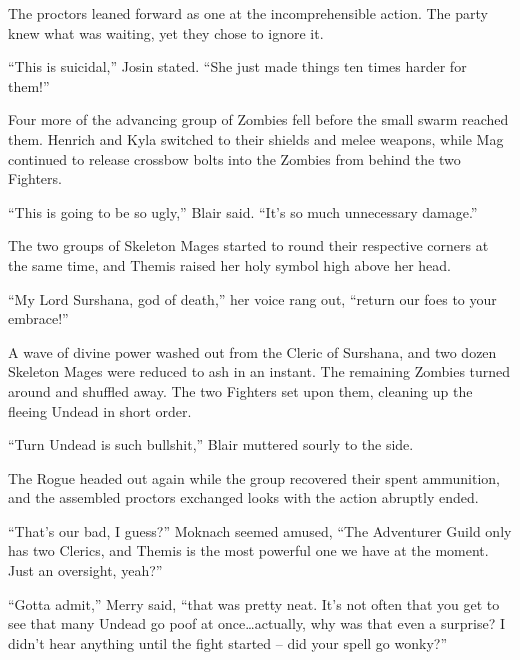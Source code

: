  

The proctors leaned forward as one at the incomprehensible action. The party knew what was waiting, yet they chose to ignore it.

 

“This is suicidal,” Josin stated. “She just made things ten times harder for them!”

 

Four more of the advancing group of Zombies fell before the small swarm reached them. Henrich and Kyla switched to their shields and melee weapons, while Mag continued to release crossbow bolts into the Zombies from behind the two Fighters.

 

“This is going to be so ugly,” Blair said. “It’s so much unnecessary damage.”

 

The two groups of Skeleton Mages started to round their respective corners at the same time, and Themis raised her holy symbol high above her head.

 

“My Lord Surshana, god of death,” her voice rang out, “return our foes to your embrace!”

 

A wave of divine power washed out from the Cleric of Surshana, and two dozen Skeleton Mages were reduced to ash in an instant. The remaining Zombies turned around and shuffled away. The two Fighters set upon them, cleaning up the fleeing Undead in short order.

 

“Turn Undead is such bullshit,” Blair muttered sourly to the side.

 

The Rogue headed out again while the group recovered their spent ammunition, and the assembled proctors exchanged looks with the action abruptly ended.

 

“That’s our bad, I guess?” Moknach seemed amused, “The Adventurer Guild only has two Clerics, and Themis is the most powerful one we have at the moment. Just an oversight, yeah?”

 

“Gotta admit,” Merry said, “that was pretty neat. It’s not often that you get to see that many Undead go poof at once…actually, why was that even a surprise? I didn’t hear anything until the fight started – did your spell go wonky?”

 

